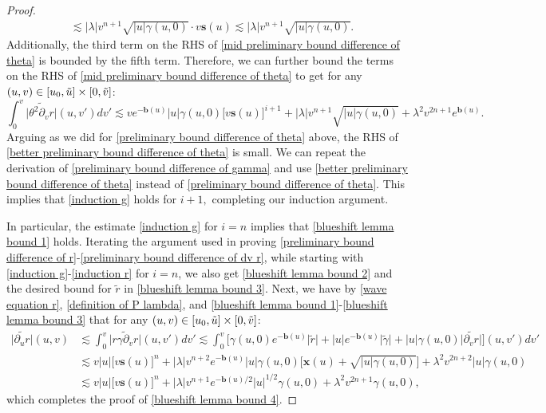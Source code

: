 \documentclass[10pt,a4paper]{amsart}
\begin{document}
\begin{proof}
\begin{align}
        &\lesssim|\lambda| v^{n+1}\sqrt{|u|\gamma(u,0)}\cdot v\mathbf{s}(u)\lesssim|\lambda| v^{n+1}\sqrt{|u|\gamma(u,0)}.
    \end{align}
    Additionally, the third term on the RHS of \eqref{mid preliminary bound difference of theta} is bounded by the fifth term. Therefore, we can further bound the terms on the RHS of \eqref{mid preliminary bound difference of theta} to get for any $(u,v)\in[u_0,\Tilde{u}]\times[0,\Tilde{v}]$:
    \begin{equation}\label{better preliminary bound difference of theta}
        \int_0^v\big|\widetilde{\theta^2\partial_vr}\big|(u,v')dv'\lesssim ve^{-\mathbf{b}(u)}|u|\gamma(u,0)\big[v\mathbf{s}(u)\big]^{i+1}+|\lambda| v^{n+1}\sqrt{|u|\gamma(u,0)}+\lambda^2v^{2n+1}e^{\mathbf{b}(u)}.
    \end{equation}
    Arguing as we did for \eqref{preliminary bound difference of theta} above, the RHS of \eqref{better preliminary bound difference of theta} is small. We can repeat the derivation of \eqref{preliminary bound difference of gamma} and use \eqref{better preliminary bound difference of theta} instead of \eqref{preliminary bound difference of theta}. This implies that \eqref{induction g} holds for $i+1,$ completing our induction argument. 

    In particular, the estimate \eqref{induction g} for $i=n$ implies that \eqref{blueshift lemma bound 1} holds. Iterating the argument used in proving \eqref{preliminary bound difference of r}-\eqref{preliminary bound difference of dv r}, while starting with \eqref{induction g}-\eqref{induction r} for $i=n$, we also get \eqref{blueshift lemma bound 2} and the desired bound for $\widetilde{r}$ in \eqref{blueshift lemma bound 3}. Next, we have by \eqref{wave equation r}, \eqref{definition of P lambda}, and \eqref{blueshift lemma bound 1}-\eqref{blueshift lemma bound 3} that for any $(u,v)\in[u_0,\Tilde{u}]\times[0,\Tilde{v}]$:
    \begin{align*}
        \big|\widetilde{\partial_ur}\big|(u,v)&\lesssim\int_{0}^v\big|\widetilde{r\gamma\partial_vr}\big|(u,v')dv'\lesssim\int_{0}^v\bigg[\gamma(u,0)e^{-\mathbf{b}(u)}\big|\widetilde{r}\big|+|u|e^{-\mathbf{b}(u)}\big|\widetilde{\gamma}\big|+|u|\gamma(u,0)\big|\widetilde{\partial_vr}\big|\bigg](u,v')dv'\\
        &\lesssim v|u|\big[v\mathbf{s}(u)\big]^{n}+|\lambda|v^{n+2}e^{-\mathbf{b}(u)}|u|\gamma(u,0)\Big[\mathbf{x}(u)+\sqrt{|u|\gamma(u,0)}\Big]+\lambda^2 v^{2n+2}|u|\gamma(u,0)\\
        &\lesssim v|u|\big[v\mathbf{s}(u)\big]^{n}+|\lambda|v^{n+1}e^{-\mathbf{b}(u)/2}|u|^{1/2}\gamma(u,0)+\lambda^2 v^{2n+1}\gamma(u,0),
    \end{align*}
    which completes the proof of \eqref{blueshift lemma bound 4}. 


\end{proof}
\end{document}
